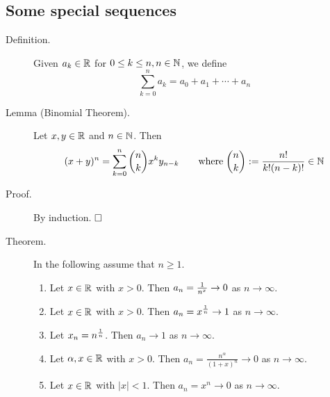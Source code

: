 \documentclass[letterpaper,11pt]{article}
\begin{document}
\subsection{Some special sequences}

\begin{description}
\item[Definition.] Given $a_k\in\mathbb{R}$ for $0\le k\le n, n\in\mathbb{N}$, we define
    \[
    \sum_{k=0}^n a_k=a_0+a_1+\cdots +a_n
    \]

\item[Lemma (Binomial Theorem).] Let $x,y\in\mathbb{R}$ and $n\in\mathbb{N}$. Then
    \[
    (x+y)^n = \sum_{k=0}^n\binom{n}{k}x^ky_{n-k}
    \qquad \text{where}\;\binom{n}{k} :=\frac{n!}{k!(n-k)!}\in\mathbb{N}
    \]

\item[Proof.] By induction. $\hfill\square$


\item[Theorem.] In the following assume that $n\ge 1$.
  \begin{enumerate}[1)]
  \item Let $x\in\mathbb{R}$ with $x>0$. Then $a_n=\frac{1}{n^x}\to0$ as $n\to\infty$.
  \item Let $x\in\mathbb{R}$ with $x>0$. Then $a_n=x^{\frac{1}{n}}\to1$ as $n\to\infty$.
  \item Let $x_n=n^{\frac{1}{n}}$. Then $a_n\to1$ as $n\to\infty$.
  \item Let $\alpha,x\in\mathbb{R}$ with $x>0$.
      Then $a_n=\frac{n^\alpha}{(1+x)^n}\to0$ as $n\to\infty$.
  \item Let $x\in\mathbb{R}$ with $|x|<1$. Then $a_n=x^n\to0$ as $n\to\infty$.
  \end{enumerate}


\end{description}
\end{document}
